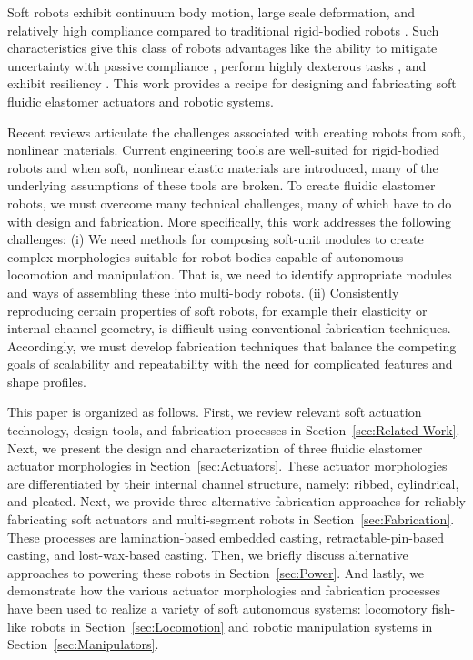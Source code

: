Soft robots exhibit continuum body motion, large scale deformation, and relatively high compliance compared to traditional rigid-bodied robots \citep{trivedi2008soft}.
%
Such characteristics give this class of robots advantages like the ability to mitigate uncertainty with passive compliance \citep{mcmahan2006field}, perform highly dexterous tasks \citep{deimel2014novel}, and exhibit resiliency \citep{tolley2014resilient}.
%
This work provides a recipe for designing and fabricating soft fluidic elastomer actuators and robotic systems.

Recent reviews \citep{trivedi2008soft, trimmer2014journal, lipson2014challenges, majidi2014soft} articulate the challenges associated with creating robots from soft, nonlinear materials.
%
Current engineering tools are well-suited for rigid-bodied robots and when soft, nonlinear elastic materials are introduced, many of the underlying assumptions of these tools are broken.
%
To create fluidic elastomer robots, we must overcome many technical challenges, many of which have to do with design and fabrication.
%
More specifically, this work addresses the following challenges:
(i) We need methods for composing soft-unit modules to create complex morphologies suitable for robot bodies capable of autonomous locomotion and manipulation.
That is, we need to identify appropriate modules and ways of assembling these into multi-body robots.
(ii) Consistently reproducing certain properties of soft robots, for example their elasticity or internal channel geometry, is difficult using conventional fabrication techniques.
Accordingly, we must develop fabrication techniques that balance the competing goals of scalability and repeatability with the need for complicated features and shape profiles.

This paper is organized as follows. 
First, we review relevant soft actuation technology, design tools, and fabrication processes in Section~\ref{sec:Related Work}.
%
Next, we present the design and characterization of three fluidic elastomer actuator morphologies in Section~\ref{sec:Actuators}.
%
These actuator morphologies are differentiated by their internal channel structure, namely: ribbed, cylindrical, and pleated.
%
Next, we provide three alternative fabrication approaches for reliably fabricating soft actuators and multi-segment robots in Section~\ref{sec:Fabrication}.
%
These processes are lamination-based embedded casting, retractable-pin-based casting, and lost-wax-based casting.
%
Then, we briefly discuss alternative approaches to powering these robots in Section~\ref{sec:Power}.
%
And lastly, we demonstrate how the various actuator morphologies and fabrication processes have been used to realize a variety of soft autonomous systems: locomotory fish-like robots in Section~\ref{sec:Locomotion} and robotic manipulation systems in Section~\ref{sec:Manipulators}.

